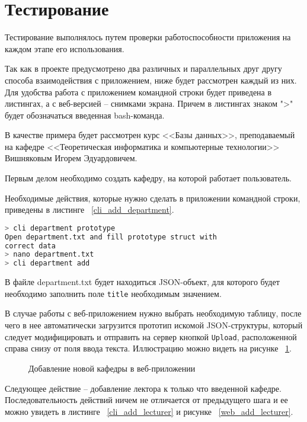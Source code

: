\section*{Тестирование}

Тестирование выполнялось путем проверки работоспособности приложения на каждом этапе его использования.

Так как в проекте предусмотрено два различных и параллельных друг другу способа взаимодействия с приложением,
ниже будет рассмотрен каждый из них. Для удобства работа с приложением командной строки будет приведена
в листингах, а с веб-версией -- снимками экрана. Причем в листингах знаком ">" будет обозначаться введенная
bash-команда.

В качестве примера будет рассмотрен курс <<Базы данных>>, преподаваемый на кафедре <<Теоретическая информатика и компьютерные технологии>>
Вишняковым Игорем Эдуардовичем.

Первым делом необходимо создать кафедру, на которой работает пользователь.

Необходимые действия, которые нужно сделать в приложении командной строки, приведены в листинге ~\ref{cli_add_department}.

\begin{lstlisting}[language=bash, caption = {Добавление кафедры}, captionpos=b, label={cli_add_department}]
> cli department prototype
Open department.txt and fill prototype struct with 
correct data
> nano department.txt 
> cli department add
\end{lstlisting}

В файле department.txt будет находиться JSON-объект, для которого будет необходимо заполнить поле \texttt{title}
необходимым значением.

В случае работы с веб-приложением нужно выбрать необходимую таблицу, после чего в нее автоматически загрузится прототип
искомой JSON-структуры, который следует модифицировать и отправить на сервер кнопкой \texttt{Upload}, расположенной справа снизу
от поля ввода текста. Иллюстрацию можно видеть на рисунке ~\ref{web_add_department}.

\begin{figure}[h!]
	\caption{Добавление новой кафедры в веб-приложении}
	\label{web_add_department}
\end{figure}

Следующее действие -- добавление лектора к только что введенной кафедре. Последовательность действий
ничем не отличается от предыдущего шага и ее можно увидеть в листинге ~\ref{cli_add_lecturer} и рисунке
~\ref{web_add_lecturer}.

